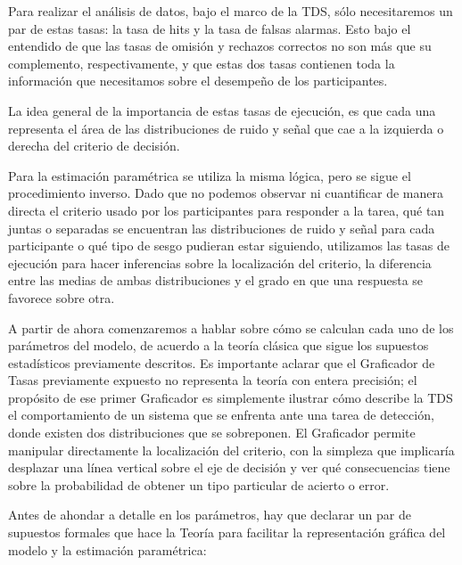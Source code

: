 Para realizar el análisis de datos, bajo el marco de la TDS, sólo necesitaremos un par de estas tasas: la tasa de hits y la tasa de falsas alarmas. Esto bajo el entendido de que las tasas de omisión y rechazos correctos no son más que su complemento, respectivamente, y que estas dos tasas contienen toda la información que necesitamos sobre el desempeño de los participantes.

La idea general de la importancia de estas tasas de ejecución, es que cada una representa el área de las distribuciones de ruido y señal que cae a la izquierda o derecha del criterio de decisión.

Para la estimación paramétrica se utiliza la misma lógica, pero se sigue el procedimiento inverso. Dado que no podemos observar ni cuantificar de manera directa el criterio usado por los participantes para responder a la tarea, qué tan juntas o separadas se encuentran las distribuciones de ruido y señal para cada participante o qué tipo de sesgo pudieran estar siguiendo, utilizamos las tasas de ejecución para hacer inferencias sobre la localización del criterio, la diferencia entre las medias de ambas distribuciones y el grado en que una respuesta se favorece sobre otra. 

A partir de ahora comenzaremos a hablar sobre cómo se calculan cada uno de los parámetros del modelo, de acuerdo a la teoría clásica que sigue los supuestos estadísticos previamente descritos.  Es importante aclarar que el Graficador de Tasas previamente expuesto no representa la teoría con entera precisión; el propósito de ese primer Graficador es simplemente ilustrar cómo describe la TDS el comportamiento de un sistema que se enfrenta ante una tarea de detección, donde existen dos distribuciones que se sobreponen. El Graficador permite manipular directamente la localización del criterio, con la simpleza que implicaría desplazar una línea vertical sobre el eje de decisión y ver qué consecuencias tiene sobre la probabilidad de obtener un tipo particular de acierto o error.


Antes de ahondar a detalle en los parámetros, hay que declarar un par de supuestos formales que hace la Teoría para facilitar la representación gráfica del modelo y la estimación paramétrica:

